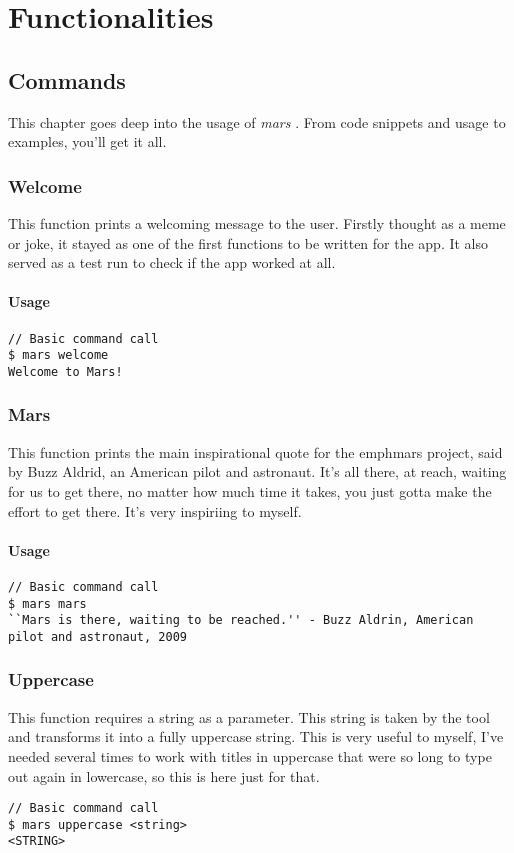 \documentclass{report}
\begin{document}
\chapter{Functionalities}
\section{Commands}
This chapter goes deep into the usage of \emph{mars} \cite{fernandezMariolfhMars2025}.  From code snippets and usage to examples, you'll get it all. 

\subsection{Welcome}
This function prints a welcoming message to the user. Firstly thought as a meme or joke, it stayed as one of the first functions to be written for the app. It also served as a test run to check if the app worked at all.
\subsubsection{Usage}
\begin{lstlisting}
// Basic command call
$ mars welcome
Welcome to Mars!
\end{lstlisting}

\subsection{Mars}
This function prints the main inspirational quote for the emph{mars} project, said by Buzz Aldrid, an American pilot and astronaut. It's all there, at reach, waiting for us to get there, no matter how much time it takes, you just gotta make the effort to get there. It's very inspiriing to myself.
\subsubsection{Usage}
\begin{lstlisting}
// Basic command call
$ mars mars
``Mars is there, waiting to be reached.'' - Buzz Aldrin, American pilot and astronaut, 2009
\end{lstlisting}

\subsection{Uppercase}
This function requires a string as a parameter. This string is taken by the tool and transforms it into a fully uppercase string. This is very useful to myself, I've needed several times to work with titles in uppercase that were so long to type out again in lowercase, so this is here just for that.
\begin{lstlisting}
// Basic command call
$ mars uppercase <string>
<STRING>
\end{lstlisting}
\end{document}

